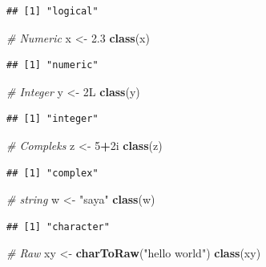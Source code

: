 \documentclass[12pt,]{krantz}
\newenvironment{Shaded}{\begin{snugshade}}{\end{snugshade}}
\newcommand{\CommentTok}[1]{\textcolor[rgb]{0.56,0.35,0.01}{\textit{#1}}}
\newcommand{\DecValTok}[1]{\textcolor[rgb]{0.00,0.00,0.81}{#1}}
\newcommand{\FloatTok}[1]{\textcolor[rgb]{0.00,0.00,0.81}{#1}}
\newcommand{\KeywordTok}[1]{\textcolor[rgb]{0.13,0.29,0.53}{\textbf{#1}}}
\newcommand{\NormalTok}[1]{#1}
\newcommand{\OperatorTok}[1]{\textcolor[rgb]{0.81,0.36,0.00}{\textbf{#1}}}
\newcommand{\StringTok}[1]{\textcolor[rgb]{0.31,0.60,0.02}{#1}}
\begin{document}
\begin{verbatim}
## [1] "logical"
\end{verbatim}

\begin{Shaded}
\begin{Highlighting}[]
\CommentTok{# Numeric}
\NormalTok{x <-}\StringTok{ }\FloatTok{2.3}
\KeywordTok{class}\NormalTok{(x)}
\end{Highlighting}
\end{Shaded}

\begin{verbatim}
## [1] "numeric"
\end{verbatim}

\begin{Shaded}
\begin{Highlighting}[]
\CommentTok{# Integer}
\NormalTok{y <-}\StringTok{ }\NormalTok{2L}
\KeywordTok{class}\NormalTok{(y)}
\end{Highlighting}
\end{Shaded}

\begin{verbatim}
## [1] "integer"
\end{verbatim}

\begin{Shaded}
\begin{Highlighting}[]
\CommentTok{# Compleks}
\NormalTok{z <-}\StringTok{ }\DecValTok{5}\OperatorTok{+}\NormalTok{2i}
\KeywordTok{class}\NormalTok{(z)}
\end{Highlighting}
\end{Shaded}

\begin{verbatim}
## [1] "complex"
\end{verbatim}

\begin{Shaded}
\begin{Highlighting}[]
\CommentTok{# string}
\NormalTok{w <-}\StringTok{ "saya"}
\KeywordTok{class}\NormalTok{(w)}
\end{Highlighting}
\end{Shaded}

\begin{verbatim}
## [1] "character"
\end{verbatim}

\begin{Shaded}
\begin{Highlighting}[]
\CommentTok{# Raw}
\NormalTok{xy <-}\StringTok{ }\KeywordTok{charToRaw}\NormalTok{(}\StringTok{"hello world"}\NormalTok{)}
\KeywordTok{class}\NormalTok{(xy)}
\end{Highlighting}
\end{Shaded}
\end{document}

